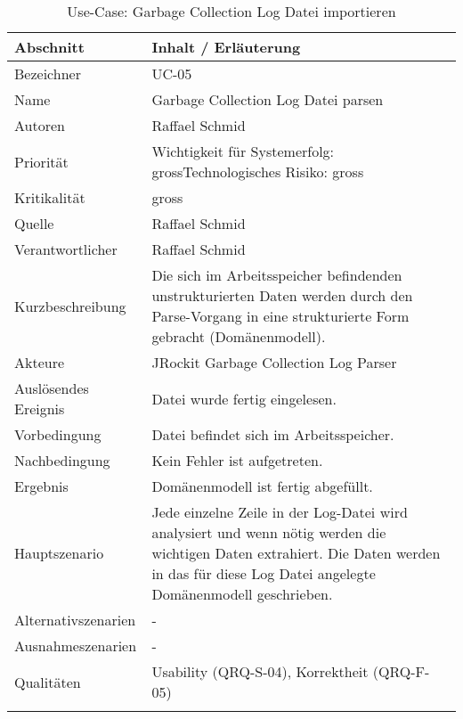\begin{longtable}{|p{4cm}|p{10.5cm}|}
\hline
   \textbf{Abschnitt} & \textbf{Inhalt / Erläuterung} \\\hline
   Bezeichner & UC-05\\\hline
   Name & Garbage Collection Log Datei parsen\\\hline
   Autoren & Raffael Schmid\\\hline
   Priorität & Wichtigkeit für Systemerfolg: gross\newline Technologisches Risiko: gross\\\hline
   Kritikalität & gross\\\hline
   Quelle & Raffael Schmid\\\hline
   Verantwortlicher & Raffael Schmid\\\hline
   Kurzbeschreibung & Die sich im Arbeitsspeicher befindenden unstrukturierten Daten werden durch den Parse-Vorgang in eine strukturierte Form gebracht (Domänenmodell). \\\hline
   Akteure & JRockit Garbage Collection Log Parser\\\hline
   Auslösendes Ereignis & Datei wurde fertig eingelesen.\\\hline
   Vorbedingung & Datei befindet sich im Arbeitsspeicher.\\\hline
   Nachbedingung & Kein Fehler ist aufgetreten.\\\hline
   Ergebnis & Domänenmodell ist fertig abgefüllt. \\\hline
   Hauptszenario & Jede einzelne Zeile in der Log-Datei wird analysiert und wenn nötig werden die wichtigen Daten extrahiert. Die Daten werden in das für diese Log Datei angelegte Domänenmodell geschrieben.
	\\\hline
   Alternativszenarien & -\\\hline
   Ausnahmeszenarien & -\\\hline
   Qualitäten & Usability (QRQ-S-04), Korrektheit (QRQ-F-05)\\\hline
\caption{Use-Case: Garbage Collection Log Datei importieren}
\end{longtable}

